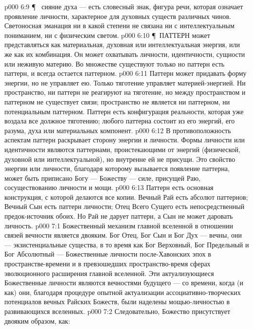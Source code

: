\vs p000 6:9 \P\  сияние духа --- есть словесный знак, фигура речи, которая означает проявление личности, характерное для духовных существ различных чинов. Светоносная эманация ни в какой степени не связана ни с интеллектуальным пониманием, ни с физическим светом.
\vs p000 6:10 \P\ ПАТТЕРН может представляться как материальная, духовная или интеллектуальная энергия, или же как их комбинация. Он может охватывать личности, идентичности, сущности или неживую материю. Во множестве существуют только  но паттерн есть паттерн, и всегда остается паттерном.
\vs p000 6:11 Паттерн может придавать форму энергии, но не управляет ею. Только тяготение управляет материей\hyp{}энергией. Ни пространство, ни паттерн не реагируют на тяготение, но между пространством и паттерном не существует связи; пространство не является ни паттерном, ни потенциальным паттерном. Паттерн есть конфигурация реальности, которая уже воздала все должное тяготению;  любого паттерна состоит из его энергий, его разума, духа или материальных компонент.
\vs p000 6:12 В противоположность аспектам  паттерн раскрывает  сторону энергии и личности. Формы личности или идентичности являются паттернами, проистекающими от энергий (физической, духовной или интеллектуальной), но внутренне ей не присущи. Это свойство энергии или личности, благодаря которому вызывается появление паттерна, может быть приписано Богу --- Божеству --- силе, присущей Раю, сосуществованию личности и мощи.
\vs p000 6:13 Паттерн есть основная конструкция, с которой делаются все копии. Вечный Рай есть абсолют паттернов; Вечный Сын есть паттерн личности; Отец Всего Сущего есть непосредственный предок\hyp{}источник обоих. Но Рай не дарует паттерн, а Сын не может даровать личность.
\vs p000 7:1 Божественный механизм главной вселенной в отношении связей вечности является двояким. Бог Отец, Бог Сын и Бог Дух --- вечны, они --- экзистенциальные существа, в то время как Бог Верховный, Бог Предельный и Бог Абсолютный ---  Божественные личности после\hyp{}Хавонских эпох в пространстве\hyp{}времени и в превзошедших пространство\hyp{}время сферах эволюционного расширения главной вселенной. Эти актуализующиеся Божественные личности являются вечностями будущего --- со времени, когда (и как) они, благодаря процедуре опытной актуализации ассоциативно\hyp{}творческих потенциалов вечных Райских Божеств, были наделены мощью\hyp{}личностью в развивающихся вселенных.
\vs p000 7:2 Следовательно, Божество присутствует двояким образом, как:
